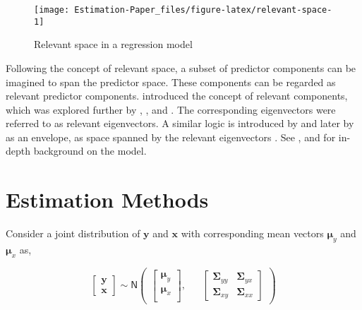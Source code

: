 \documentclass[12pt,3p,authoryear]{elsarticle}
\begin{document}
\begin{figure}

{\centering \texttt{[image: Estimation-Paper\_files/figure-latex/relevant-space-1]} 

}

\caption{Relevant space in a regression model}\label{fig:relevant-space}
\end{figure}

Following the concept of relevant space, a subset of predictor components can be imagined to span the predictor space. These components can be regarded as relevant predictor components. \citet{Naes1985} introduced the concept of relevant components, which was explored further by \citet{helland1990partial}, \citet{naes1993relevant}, \citet{Helland1994b} and \citet{Helland2000}. The corresponding eigenvectors were referred to as relevant eigenvectors. A similar logic is introduced by \citet{cook2010envelope} and later by \citet{cook2013envelopes} as an envelope, as space spanned by the relevant eigenvectors \citep[p.101]{cook2018envelope}. See \citet{Rimal2018}, \citet{saebo2015simrel} and \citet{rimal2019pred} for in-depth background on the model.

\hypertarget{estimation-methods}{%
\section{Estimation Methods}\label{estimation-methods}}

Consider a joint distribution of \(\mathbf{y}\) and \(\mathbf{x}\) with corresponding mean vectors \(\boldsymbol{\mu}_y\) and \(\boldsymbol{\mu}_x\) as,

\begin{equation}
  \begin{bmatrix}
    \mathbf{y} \\ \mathbf{x}
  \end{bmatrix} 
  \sim \mathsf{N}
  \begin{pmatrix}
    \begin{bmatrix}
      \boldsymbol{\mu}_y \\
      \boldsymbol{\mu}_x \\
    \end{bmatrix}, &&
    \begin{bmatrix}
      \boldsymbol{\Sigma}_{yy} & \boldsymbol{\Sigma}_{yx} \\
      \boldsymbol{\Sigma}_{xy} & \boldsymbol{\Sigma}_{xx} 
    \end{bmatrix}
  \end{pmatrix}
  \label{eq:model-1}
\end{equation}
\end{document}
